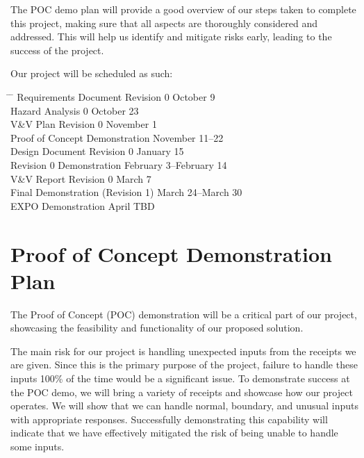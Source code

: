 \documentclass{article}
\begin{document}
The POC demo plan will provide a good overview of our steps taken to complete this project, making sure that all aspects are thoroughly considered and addressed. This will help us identify and mitigate risks early, leading to the success of the project.

Our project will be scheduled as such: \\

\begin{tabbing}
  \hspace{8cm} \= \hspace{3cm} \= \kill
  Requirements Document Revision 0 \> October 9 \\
  Hazard Analysis 0 \> October 23 \\
  V\&V Plan Revision 0 \> November 1 \\
  Proof of Concept Demonstration \> November 11--22 \\
  Design Document Revision 0 \> January 15 \\
  Revision 0 Demonstration \> February 3--February 14 \\
  V\&V Report Revision 0 \> March 7 \\
  Final Demonstration (Revision 1) \> March 24--March 30 \\
  EXPO Demonstration \> April TBD \\
\end{tabbing}

\section{Proof of Concept Demonstration Plan}

\vspace{0.5cm}

The Proof of Concept (POC) demonstration will be a critical part of our project, showcasing the feasibility and functionality of our proposed solution.

The main risk for our project is handling unexpected inputs from the receipts we are given. Since this is the primary purpose of the project, failure to handle these inputs 100\% of the time would be a significant issue. To demonstrate success at the POC demo, we will bring a variety of receipts and showcase how our project operates. We will show that we can handle normal, boundary, and unusual inputs with appropriate responses. Successfully demonstrating this capability will indicate that we have effectively mitigated the risk of being unable to handle some inputs.
\end{document}
